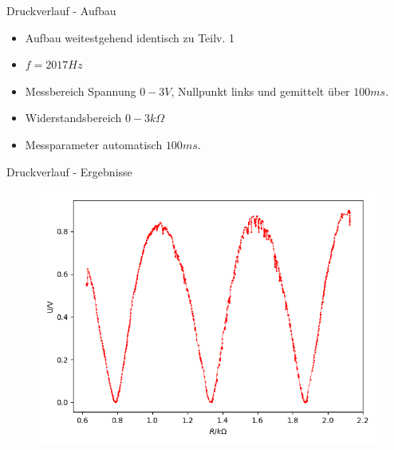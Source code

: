 \documentclass[12pt]{beamer}
\begin{document}
	\begin{frame}{Druckverlauf - Aufbau}
	\begin{itemize}
	\item Aufbau weitestgehend identisch zu Teilv. 1
	\item $f=2017Hz$
	\item Messbereich Spannung $0-3V$, Nullpunkt links und gemittelt über $100ms$.
	\item Widerstandsbereich $0-3k \Omega$
	\item Messparameter automatisch $100ms$.
	\end{itemize}
	
	\end{frame}
	
	\begin{frame}{Druckverlauf - Ergebnisse}
	\begin{figure}
	\includegraphics[scale=0.5]{druckverlauf}
	\end{figure}
	\end{frame}
	
\end{document}
